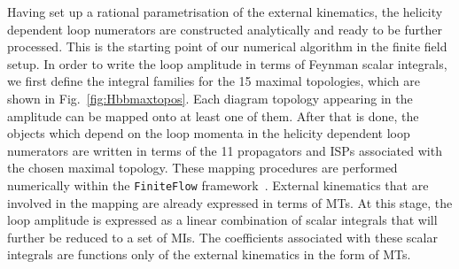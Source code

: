 \documentclass[main.tex]{subfiles}
\begin{document}
Having set up a rational parametrisation of the external kinematics, the helicity dependent loop numerators are constructed analytically and
ready to be further processed.
This is the starting point of our numerical algorithm in the finite field setup. 
In order to write the loop amplitude in terms of Feynman scalar integrals, 
we first define the integral families for the 15 maximal topologies, which are shown in Fig.~\ref{fig:Hbbmaxtopos}. 
Each diagram topology appearing in the amplitude can be mapped onto at least one of them. 
After that is done, the objects which depend on the loop momenta in the helicity dependent loop numerators are written in terms of 
the 11 propagators and ISPs associated with the chosen maximal topology. 
These mapping procedures are performed numerically within the \texttt{FiniteFlow} framework~\cite{Peraro:2019svx}. 
External kinematics that are involved in the mapping are already expressed in terms of MTs.
At this stage, the loop amplitude is expressed as a linear combination of scalar integrals that will further be 
reduced to a set of MIs. The coefficients associated with these scalar integrals are functions only of the external kinematics in the
form of MTs.
\end{document}
